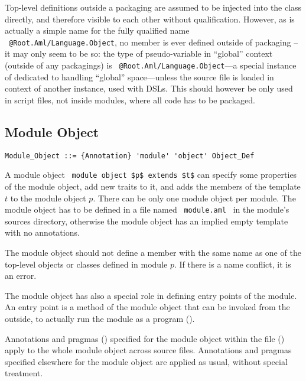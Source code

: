 Top-level definitions outside a packaging are assumed to be injected into the  class directly, and therefore visible to each other without qualification. However, as  is actually a simple name for the fully qualified name ~\lstinline!@Root.Aml/Language.Object!, no member is ever defined outside of packaging -- it may only seem to be so: the type of  pseudo-variable in ``global'' context (outside of any packagings) is ~\lstinline!@Root.Aml/Language.Object!---a special instance of  dedicated to handling ``global'' space---unless the source file is loaded in context of another instance, used with DSLs. This should however be only used in script files, not inside modules, where all code has to be packaged. 






\subsection{Module Object}

\grammar\begin{lstlisting}
Module_Object ::= {Annotation} 'module' 'object' Object_Def
\end{lstlisting}

A module object ~\lstinline!module object $p$ extends $t$! can specify some properties of the module object, add new traits to it, and adds the members of the template $t$ to the module object $p$. There can be only one module object per module. The module object has to be defined in a file named ~\lstinline[deletekeywords={module}]!module.aml!~ in the module's sources directory, otherwise the module object has an implied empty template with no annotations. 

The module object should not define a member with the same name as one of the top-level objects or classes defined in module $p$. If there is a name conflict, it is an error. 

The module object has also a special role in defining entry points of the module. An entry point is a method of the module object that can be invoked from the outside, to actually run the module as a program (). 

Annotations and pragmas () specified for the module object within the  file () apply to the whole module object across source files. Annotations and pragmas specified elsewhere for the module object are applied as usual, without special treatment. 






